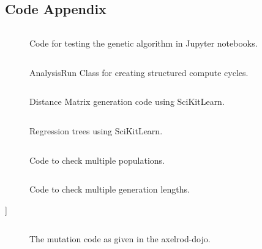 \begin{appendices}
    \chapter{Code Appendix}\label{apndx:code}
    \begin{figure}[ht]
        \inputminted[fontsize=\small]{python}{./code_snippets/appendix/runGeneticAlgo.py}
        \caption{Code for testing the genetic algorithm in Jupyter notebooks.}\label{apcode:runGeneticAlgo.py}
    \end{figure}

    \begin{figure}[ht]
        \inputminted[fontsize=\small]{python}{./code_snippets/appendix/AnalysisRun.py}
        \caption{AnalysisRun Class for creating structured compute cycles.}\label{apcode:AnalysisRun.py}
    \end{figure}

    \begin{figure}[ht]
        \inputminted[fontsize=\small]{python}{./code_snippets/appendix/dist_matrix.py}
        \caption{Distance Matrix generation code using SciKitLearn.}\label{apcode:dist_matrix.py}
    \end{figure}

    \begin{figure}[ht]
        \inputminted[fontsize=\small]{python}{./code_snippets/appendix/reg_tree.py}
        \caption{Regression trees using SciKitLearn.}\label{apcode:reg_tree.py}
    \end{figure}

    \begin{figure}
        \inputminted[fontsize=\small]{python}{code_snippets/populationChecker.py}
        \caption{Code to check multiple populations.}\label{apcode:populationChecker.py}
    \end{figure}

    \begin{figure}
        \inputminted{python}{code_snippets/generationChecker.py}
        \caption{Code to check multiple generation lengths.}\label{apcode:generationChecker.py}
    \end{figure}]

    \begin{figure}
        \inputminted{python}{code_snippets/mutateFromDojo.py}
        \caption{The mutation code as given in the axelrod-dojo.}
        \label{apcode:mutateFromDojo}
    \end{figure}
    

\end{appendices}
